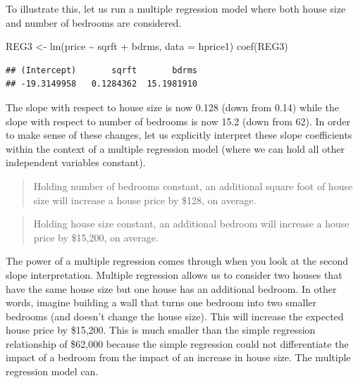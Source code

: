 \documentclass[
]{book}
\newenvironment{Shaded}{\begin{snugshade}}{\end{snugshade}}
\newcommand{\AttributeTok}[1]{\textcolor[rgb]{0.77,0.63,0.00}{#1}}
\newcommand{\FunctionTok}[1]{\textcolor[rgb]{0.00,0.00,0.00}{#1}}
\newcommand{\NormalTok}[1]{#1}
\newcommand{\OtherTok}[1]{\textcolor[rgb]{0.56,0.35,0.01}{#1}}
\newcommand{\SpecialCharTok}[1]{\textcolor[rgb]{0.00,0.00,0.00}{#1}}
\begin{document}
To illustrate this, let us run a multiple regression model where both house size and number of bedrooms are considered.

\begin{Shaded}
\begin{Highlighting}[]
\NormalTok{REG3 }\OtherTok{\textless{}{-}} \FunctionTok{lm}\NormalTok{(price }\SpecialCharTok{\textasciitilde{}}\NormalTok{ sqrft }\SpecialCharTok{+}\NormalTok{ bdrms, }\AttributeTok{data =}\NormalTok{ hprice1)}
\FunctionTok{coef}\NormalTok{(REG3)}
\end{Highlighting}
\end{Shaded}

\begin{verbatim}
## (Intercept)       sqrft       bdrms 
## -19.3149958   0.1284362  15.1981910
\end{verbatim}

The slope with respect to house size is now 0.128 (down from 0.14) while the slope with respect to number of bedrooms is now 15.2 (down from 62). In order to make sense of these changes, let us explicitly interpret these slope coefficients within the context of a multiple regression model (where we can hold all other independent variables constant).

\begin{quote}
Holding number of bedrooms constant, an additional square foot of house size will increase a house price by \$128, on average.
\end{quote}

\begin{quote}
Holding house size constant, an additional bedroom will increase a house price by \$15,200, on average.
\end{quote}

The power of a multiple regression comes through when you look at the second slope interpretation. Multiple regression allows us to consider two houses that have the same house size but one house has an additional bedroom. In other words, imagine building a wall that turns one bedroom into two smaller bedrooms (and doesn't change the house size). This will increase the expected house price by \$15,200. This is much smaller than the simple regression relationship of \$62,000 because the simple regression could not differentiate the impact of a bedroom from the impact of an increase in house size. The multiple regression model can.
\end{document}
